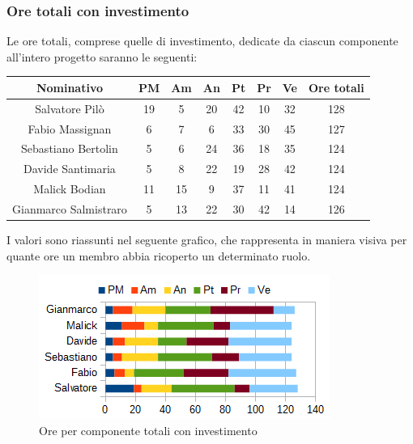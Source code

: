 		\subsubsection{Ore totali con investimento}
		Le ore totali, comprese quelle di investimento, dedicate da ciascun componente all'intero progetto saranno le seguenti: \\
		\begin{table}[H]
		\centering
		\begin{tabular}{|c|c|c|c|c|c|c|c|}
			\hline
			\textbf{Nominativo}		& \textbf{PM}	& \textbf{Am}	& \textbf{An}	& \textbf{Pt}	& \textbf{Pr}	& \textbf{Ve}	& \textbf{Ore totali}     \\
			\hline
			Salvatore Pilò			& 19	& 5		& 20	& 42	& 10	& 32	& 128 \\
			Fabio Massignan			& 6		& 7		& 6		& 33	& 30	& 45	& 127 \\
			Sebastiano Bertolin		& 5		& 6		& 24	& 36	& 18	& 35	& 124 \\
			Davide Santimaria		& 5		& 8		& 22	& 19	& 28	& 42	& 124 \\
			Malick Bodian			& 11	& 15	& 9		& 37	& 11	& 41	& 124 \\
			Gianmarco Salmistraro	& 5		& 13	& 22	& 30	& 42	& 14	& 126 \\
			\hline
		\end{tabular}
		\end{table}
		I valori sono riassunti nel seguente grafico, che rappresenta in maniera visiva per quante ore un membro abbia ricoperto un determinato ruolo. \\
		\begin{figure}[H]
			\centering
			\includegraphics[width=1\linewidth]{immagini/grafici/riepilogo_conclusivo-barra.png}
			\caption{Ore per componente totali con investimento}
		\end{figure}
